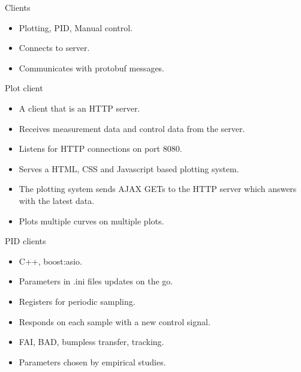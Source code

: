 \documentclass{beamer}
\begin{document}
\begin{frame}{Clients}
	\begin{itemize}
   		\item Plotting, PID, Manual control.
        \item Connects to server.
		\item Communicates with protobuf messages.
    \end{itemize}
\end{frame}

\begin{frame}{Plot client}
	\begin{itemize}
    	\item A client that is an HTTP server.
        \item Receives measurement data and control data from the server.
        \item Listens for HTTP connections on port 8080.
        \item Serves a HTML, CSS and Javascript based plotting system.
        \item The plotting system sends AJAX GETs to the HTTP server which answers with the latest data.
        \item Plots multiple curves on multiple plots.
    \end{itemize}
\end{frame}

\begin{frame}{PID clients}
	\begin{itemize}
		\item C++, boost:asio.
		\item Parameters in .ini files updates on the go.
		\item Registers for periodic sampling.
		\item Responds on each sample with a new control signal.
		\item FAI, BAD, bumpless transfer, tracking.
		\item Parameters chosen by empirical studies.
	\end{itemize}
\end{frame}
\end{document}
